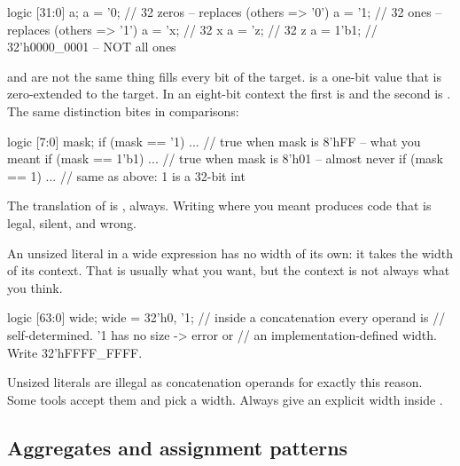 \begin{svcode}[caption={The fill literals.},label={lst:rosetta:fill}]
logic [31:0] a;
a = '0;    // 32 zeros   -- replaces (others => '0')
a = '1;    // 32 ones    -- replaces (others => '1')
a = 'x;    // 32 x
a = 'z;    // 32 z
a = 1'b1;  // 32'h0000_0001  -- NOT all ones
\end{svcode}

\begin{gotcha}{ and  are not the same thing}
 fills every bit of the target.  is a one-bit value that is
zero-extended to the target. In an eight-bit context the first is
 and the second is . The same distinction bites in
comparisons:
\begin{svcode}
logic [7:0] mask;
if (mask == '1)   ... // true when mask is 8'hFF   -- what you meant
if (mask == 1'b1) ... // true when mask is 8'h01   -- almost never
if (mask == 1)    ... // same as above: 1 is a 32-bit int
\end{svcode}
The \VHDL{} translation of  is , always. Writing
 where you meant  produces code that is legal, silent, and
wrong.
\end{gotcha}

\begin{gotcha}{An unsized literal in a wide expression}
 has no width of its own: it takes the width of its context. That is
usually what you want, but the context is not always what you think.
\begin{svcode}
logic [63:0] wide;
wide = {32'h0, '1};   // inside a concatenation every operand is
                      // self-determined. '1 has no size -> error or
                      // an implementation-defined width. Write 32'hFFFF_FFFF.
\end{svcode}
Unsized literals are illegal as concatenation operands for exactly this reason.
Some tools accept them and pick a width. Always give an explicit width inside
\code{\{\}}.
\end{gotcha}

\subsection{Aggregates and assignment patterns}

